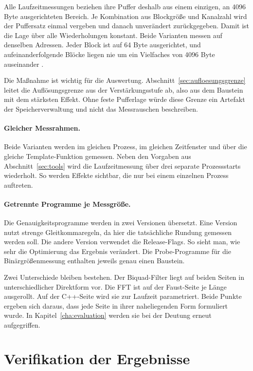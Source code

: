 Alle Laufzeitmessungen beziehen ihre Puffer deshalb aus einem einzigen, an 4096 Byte ausgerichteten Bereich. Je Kombination aus Blockgröße und Kanalzahl wird der Puffersatz einmal vergeben und danach unverändert zurückgegeben. Damit ist die Lage über alle Wiederholungen konstant. Beide Varianten messen auf denselben Adressen. Jeder Block ist auf 64 Byte ausgerichtet, und aufeinanderfolgende Blöcke liegen nie um ein Vielfaches von 4096 Byte auseinander \parencite{hennessy2025computer}.

Die Maßnahme ist wichtig für die Auswertung. Abschnitt~\ref{sec:aufloesungsgrenze} leitet die Auflösungsgrenze aus der Verstärkungsstufe ab, also aus dem Baustein mit dem stärksten Effekt. Ohne feste Pufferlage würde diese Grenze ein Artefakt der Speicherverwaltung und nicht das Messrauschen beschreiben.

\paragraph{Gleicher Messrahmen.}
Beide Varianten werden im gleichen Prozess, im gleichen Zeitfenster und über die gleiche Template-Funktion gemessen. Neben den Vorgaben aus Abschnitt~\ref{sec:tools} wird die Laufzeitmessung über drei separate Prozessstarts wiederholt. So werden Effekte sichtbar, die nur bei einem einzelnen Prozess auftreten.

\paragraph{Getrennte Programme je Messgröße.}
Die Genauigkeitsprogramme werden in zwei Versionen übersetzt. Eine Version nutzt strenge Gleitkommaregeln, da hier die tatsächliche Rundung gemessen werden soll. Die andere Version verwendet die Release-Flags. So sieht man, wie sehr die Optimierung das Ergebnis verändert. Die Probe-Programme für die Binärgrößenmessung enthalten jeweils genau einen Baustein.

Zwei Unterschiede bleiben bestehen. Der Biquad-Filter liegt auf beiden Seiten in unterschiedlicher Direktform vor. Die FFT ist auf der Faust-Seite je Länge ausgerollt. Auf der C++-Seite wird sie zur Laufzeit parametriert. Beide Punkte ergeben sich daraus, dass jede Seite in ihrer naheliegenden Form formuliert wurde. In Kapitel~\ref{cha:evaluation} werden sie bei der Deutung erneut aufgegriffen.

\section{Verifikation der Ergebnisse}
\label{sec:verifikation}

